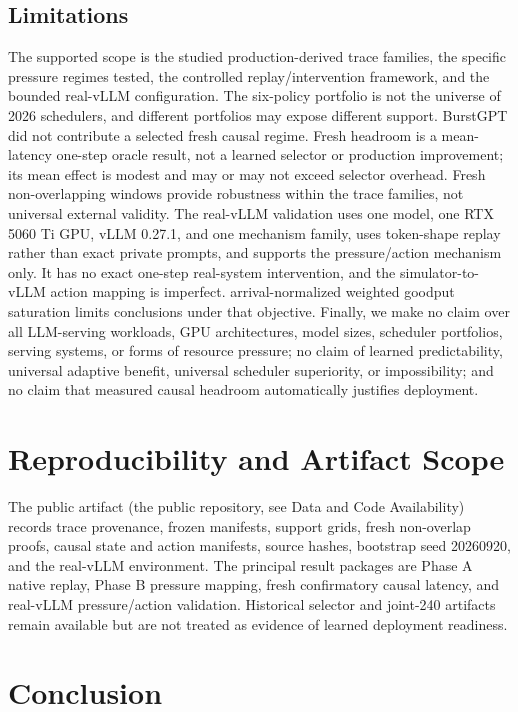 \documentclass[preprint,12pt]{elsarticle}
\begin{document}
\subsection{Limitations}
The supported scope is the studied production-derived trace families, the
specific pressure regimes tested, the controlled replay/intervention
framework, and the bounded real-vLLM configuration. The six-policy portfolio is not
the universe of 2026 schedulers, and different portfolios may expose
different support. BurstGPT did not contribute a selected fresh causal
regime. Fresh headroom is a mean-latency one-step oracle result, not a
learned selector or production improvement; its mean effect is modest and may
or may not exceed selector overhead. Fresh non-overlapping windows provide
robustness within the trace families, not universal external validity. The
real-vLLM validation uses one model, one RTX 5060 Ti GPU, vLLM 0.27.1, and
one mechanism family, uses token-shape replay rather than exact private
prompts, and supports the pressure/action mechanism only. It has no exact
one-step real-system intervention, and the simulator-to-vLLM action mapping
is imperfect. arrival-normalized weighted goodput saturation limits conclusions under that objective.
Finally, we make no claim over all LLM-serving workloads, GPU architectures,
model sizes, scheduler portfolios, serving systems, or forms of resource
pressure; no claim of learned predictability, universal adaptive benefit,
universal scheduler superiority, or impossibility; and no claim that measured
causal headroom automatically justifies deployment.

\section{Reproducibility and Artifact Scope}
\label{sec:repro}

The public artifact (the public repository, see Data and Code
Availability) records trace provenance, frozen manifests, support grids,
fresh non-overlap proofs, causal state and action manifests, source hashes,
bootstrap seed 20260920, and the real-vLLM environment. The principal result
packages are Phase A native replay, Phase B pressure mapping, fresh
confirmatory causal latency, and real-vLLM pressure/action validation.
Historical selector and joint-240 artifacts remain available but are not
treated as evidence of learned deployment readiness.

\section{Conclusion}
\label{sec:conclusion}
\end{document}
